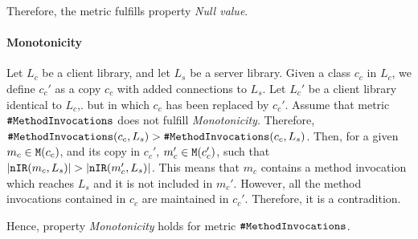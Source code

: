 Therefore, the metric fulfills property \textit{Null value}.

\paragraph{Monotonicity}
Let $L_c$ be a client library, and let $L_s$ be a server library. Given a class $c_c$ in $L_c$, we define $c_c'$ as a copy $c_c$ with added connections to $L_s$. Let $L_c'$ be a client library identical to $L_c$,. but in which $c_c$ has been replaced by $c_c'$. Assume that metric $\verb|#MethodInvocations|$ does not fulfill \textit{Monotonicity}. Therefore, $\verb|#MethodInvocations|(c_c, L_s) > \verb|#MethodInvocations|(c_c, L_s)$.
Then, for a given $m_c \in \verb|M|(c_c)$, and its copy in $c_c'$, $m_c' \in \verb|M|(c_c')$, such that $|\verb|nIR|(m_c, L_s)| > |\verb|nIR|(m_c', L_s)|$. This means that $m_c$ contains a method invocation which reaches $L_s$ and it is not included in $m_c'$. However, all the method invocations contained in $c_c$ are maintained in $c_c'$. Therefore, it is a contradition.

Hence, property \textit{Monotonicity} holds for metric $\verb|#MethodInvocations|$.
